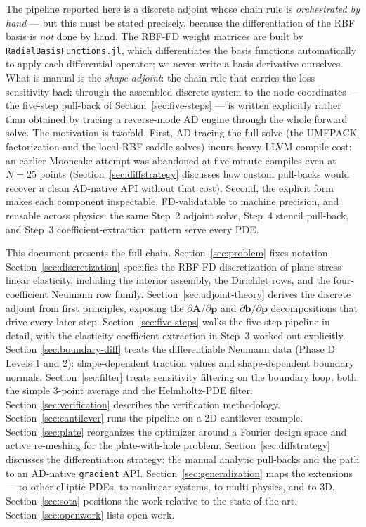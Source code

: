 \documentclass[11pt,a4paper]{article}
\newcommand{\mat}[1]{\mathbf{#1}}
\newcommand{\vect}[1]{\boldsymbol{#1}}
\newcommand{\pts}{\vect{p}}
\begin{document}
The pipeline reported here is a discrete adjoint whose chain rule is
\emph{orchestrated by hand} --- but this must be stated precisely, because the
differentiation of the RBF basis is \emph{not} done by hand. The RBF-FD weight
matrices are built by \texttt{RadialBasisFunctions.jl}, which differentiates the
basis functions automatically to apply each differential operator; we never write a
basis derivative ourselves. What is manual is the \emph{shape adjoint}: the chain
rule that carries the loss sensitivity back through the assembled discrete system to
the node coordinates --- the five-step pull-back of Section~\ref{sec:five-steps} ---
is written explicitly rather than obtained by tracing a reverse-mode AD engine
through the whole forward solve. The motivation is twofold. First, AD-tracing the
full solve (the UMFPACK factorization and the local RBF saddle solves) incurs heavy
LLVM compile cost: an earlier Mooncake attempt was abandoned at five-minute compiles
even at $N=25$ points (Section~\ref{sec:diffstrategy} discusses how custom pull-backs
would recover a clean AD-native API without that cost). Second, the explicit form
makes each component inspectable, FD-validatable to machine precision, and reusable
across physics: the same Step~2 adjoint solve, Step~4 stencil pull-back, and Step~3
coefficient-extraction pattern serve every PDE.

This document presents the full chain. Section~\ref{sec:problem} fixes
notation. Section~\ref{sec:discretization} specifies the RBF-FD
discretization of plane-stress linear elasticity, including the
interior assembly, the Dirichlet rows, and the four-coefficient
Neumann row family. Section~\ref{sec:adjoint-theory} derives the
discrete adjoint from first principles, exposing the
$\partial\mat A/\partial\pts$ and $\partial\vect b/\partial\pts$
decompositions that drive every later step.
Section~\ref{sec:five-steps} walks the five-step pipeline in detail,
with the elasticity coefficient extraction in Step~3 worked out
explicitly. Section~\ref{sec:boundary-diff} treats the differentiable
Neumann data (Phase D Levels 1 and 2): shape-dependent traction
values and shape-dependent boundary normals.
Section~\ref{sec:filter} treats sensitivity filtering on the boundary
loop, both the simple 3-point average and the Helmholtz-PDE filter.
Section~\ref{sec:verification} describes the verification methodology.
Section~\ref{sec:cantilever} runs the pipeline on a 2D cantilever
example. Section~\ref{sec:plate} reorganizes the optimizer around a Fourier
design space and active re-meshing for the plate-with-hole problem.
Section~\ref{sec:diffstrategy} discusses the differentiation strategy: the
manual analytic pull-backs and the path to an AD-native \texttt{gradient} API.
Section~\ref{sec:generalization} maps the extensions ---
to other elliptic PDEs, to nonlinear systems, to multi-physics, and
to 3D. Section~\ref{sec:sota} positions the work relative to the
state of the art. Section~\ref{sec:openwork} lists open work.
\end{document}
